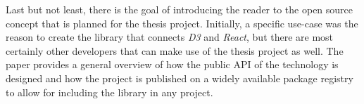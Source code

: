 Last but not least, there is the goal of introducing the reader to the open source concept that is planned for the thesis project. Initially, a specific use-case was the reason to create the library that connects \emph{D3} and \emph{React}, but there are most certainly other developers that can make use of the thesis project as well. The paper provides a general overview of how the public API of the technology is designed and how the project is published on a widely available package registry to allow for including the library in any project.
